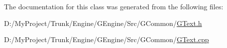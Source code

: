 The documentation for this class was generated from the following files\+:\begin{DoxyCompactItemize}
\item 
D\+:/\+My\+Project/\+Trunk/\+Engine/\+G\+Engine/\+Src/\+G\+Common/\hyperlink{_g_text_8h}{G\+Text.\+h}\item 
D\+:/\+My\+Project/\+Trunk/\+Engine/\+G\+Engine/\+Src/\+G\+Common/\hyperlink{_g_text_8cpp}{G\+Text.\+cpp}\end{DoxyCompactItemize}
